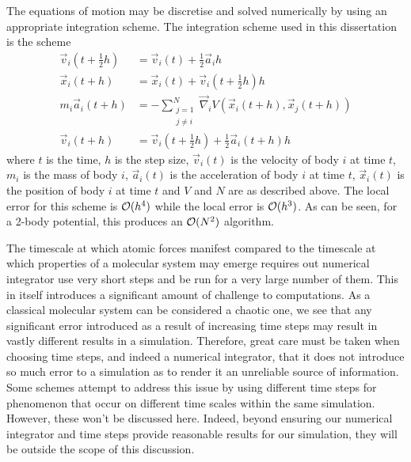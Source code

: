 %
The equations of motion may be discretise and solved numerically
by using an appropriate integration scheme.
The integration scheme used in this dissertation is
the \velocityverlet{} scheme
\begin{align}
\label{eqn:velocity_verlet_scheme}
    \vec{v}_i(t + \tfrac{1}{2} h) &=
        \vec{v}_i(t) + \tfrac{1}{2}\vec{a}_i h
    \\
    \vec{x}_i(t + h) &=
        \vec{x}_i(t) + \vec{v}_i(t + \tfrac{1}{2} h) h
    \\
    m_i \vec{a}_i(t + h) &=
        - \sum_{\substack{j=1\\j\ne{}i}}^N
            \vec{\nabla}_i V(\vec{x}_i(t+h), \vec{x}_j(t+h))
    \\
    \vec{v}_i(t+h) &=
        \vec{v}_i(t + \tfrac{1}{2} h) + \tfrac{1}{2} \vec{a}_i(t + h) h
\end  {align}
where $t$ is the time,
$h$ is the step size,
$\vec{v}_i(t)$ is the velocity of body $i$ at time $t$,
$m_i$ is the mass of body $i$,
$\vec{a}_i(t)$ is the acceleration of body $i$ at time $t$,
$\vec{x}_i(t)$ is the position of body $i$ at time $t$ and
$V$ and $N$ are as described above.
%
The local error for this scheme is $\mathcal{O}{(h^4)}$ while the local error
is $\mathcal{O}{(h^3)}$.
%
As can be seen, for a 2-body potential,
this produces an $\mathcal{O}{(N^2)}$ algorithm.

%
The timescale at which atomic forces manifest compared to
the timescale at which properties of a molecular system may emerge
requires out numerical integrator use very short steps and be run for
a very large number of them.
%
This in itself introduces a significant amount of challenge to computations.
%
As a classical molecular system can be considered a chaotic one,
we see that any significant error introduced as a result of
increasing time steps may result in
vastly different results in a simulation.
%
Therefore, great care must be taken when choosing time steps, and
indeed a numerical integrator,
that it does not introduce so much error to a simulation as to render it
an unreliable source of information.
%
Some schemes attempt to address this issue by
using different time steps for phenomenon that occur on
different time scales within the same simulation.
%
However, these won’t be discussed here.
%
Indeed, beyond ensuring our numerical integrator and time steps provide
reasonable results for our simulation,
they will be outside the scope of this discussion.


